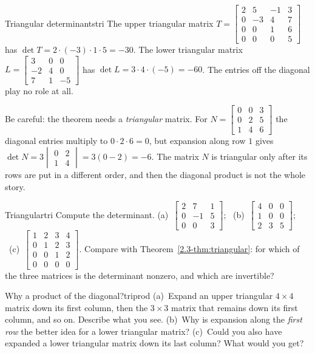 \documentclass[11pt]{article}
\begin{document}
\begin{exmp}{Triangular determinants}{tri}
The upper triangular matrix $T=\begin{bmatrix}2&5&-1&3\\0&-3&4&7\\0&0&1&6\\0&0&0&5\end{bmatrix}$ has $\det T=2\cdot(-3)\cdot1\cdot5=-30$. The lower triangular matrix $L=\begin{bmatrix}3&0&0\\-2&4&0\\7&1&-5\end{bmatrix}$ has $\det L=3\cdot4\cdot(-5)=-60$. The entries off the diagonal play no role at all.

Be careful: the theorem needs a \emph{triangular} matrix. For $N=\begin{bmatrix}0&0&3\\0&2&5\\1&4&6\end{bmatrix}$ the diagonal entries multiply to $0\cdot2\cdot6=0$, but expansion along row $1$ gives $\det N=3\begin{vmatrix}0&2\\1&4\end{vmatrix}=3(0-2)=-6$. The matrix $N$ is triangular only after its rows are put in a different order, and then the diagonal product is not the whole story.
\end{exmp}

\begin{kc}{Triangular}{tri}
Compute the determinant. (a)~$\begin{bmatrix}2&7&1\\0&-1&5\\0&0&3\end{bmatrix}$; \ (b)~$\begin{bmatrix}4&0&0\\1&0&0\\2&3&5\end{bmatrix}$; \ (c)~$\begin{bmatrix}1&2&3&4\\0&1&2&3\\0&0&1&2\\0&0&0&0\end{bmatrix}$. Compare with Theorem~\ref{2.3-thm:triangular}: for which of the three matrices is the determinant nonzero, and which are invertible?
\end{kc}

\begin{think}{Why a product of the diagonal?}{triprod}
(a)~Expand an upper triangular $4\times4$ matrix down its first column, then the $3\times3$ matrix that remains down its first column, and so on. Describe what you see. (b)~Why is expansion along the \emph{first row} the better idea for a lower triangular matrix? (c)~Could you also have expanded a lower triangular matrix down its last column? What would you get?
\end{think}
\end{document}

